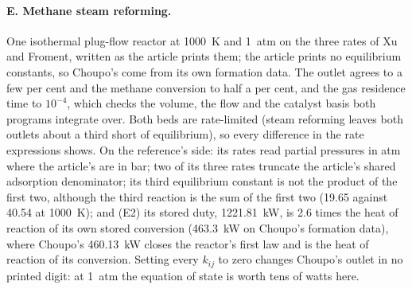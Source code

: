 \documentclass[11pt,a4paper]{article}
\begin{document}
\paragraph{E. Methane steam reforming.}  One isothermal plug-flow reactor
at 1000~K and 1~atm on the three rates of Xu and Froment, written as the
article prints them; the article prints no equilibrium constants, so
Choupo's come from its own formation data.  The outlet agrees to a few per
cent and the methane conversion to half a per cent, and the gas residence
time to $10^{-4}$, which checks the volume, the flow and the catalyst basis
both programs integrate over.  Both beds are rate-limited (steam reforming
leaves both outlets about a third short of equilibrium), so every
difference in the rate expressions shows.  On the reference's side: its
rates read partial pressures in atm where the article's are in bar; two of
its three rates truncate the article's shared adsorption denominator; its
third equilibrium constant is not the product of the first two, although
the third reaction is the sum of the first two (19.65 against 40.54 at
1000~K); and (E2) its stored duty, 1221.81~kW, is 2.6 times the heat of
reaction of its own stored conversion (463.3~kW on Choupo's formation data),
where Choupo's 460.13~kW closes the reactor's first law and is the heat of
reaction of its conversion.  Setting every $k_{ij}$ to zero changes
Choupo's outlet in no printed digit: at 1~atm the equation of state is
worth tens of watts here.
\end{document}
